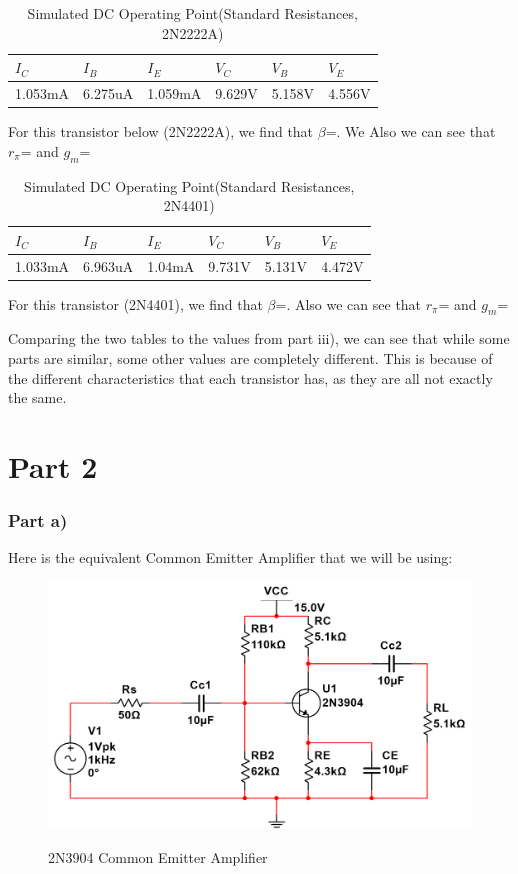 \documentclass[12pt]{article}
\begin{document}
\begin{table}[h!]
\centering
\begin{tabular}{|l|l|l|l|l|l|}
\cline{1-6}
$I_C$      & $I_B$      & $I_E$      & $V_C$     & $V_B$     & $V_E$     \\ \cline{1-6}
\hline
1.053mA & 6.275uA & 1.059mA & 9.629V & 5.158V & 4.556V \\ 
\hline
\end{tabular}
\caption{Simulated DC Operating Point(Standard Resistances, 2N2222A)}
\label{table:DC Standard Operating Values(2N2222A)}
\end{table}

For this transistor below (2N2222A), we find that $\beta$=. We Also we can see that $r_\pi$= and $g_m$=


\begin{table}[h!]
\centering
\begin{tabular}{|l|l|l|l|l|l|}
\cline{1-6}
$I_C$      & $I_B$      & $I_E$      & $V_C$     & $V_B$     & $V_E$     \\ \cline{1-6}
\hline
1.033mA & 6.963uA & 1.04mA & 9.731V & 5.131V & 4.472V \\ 
\hline
\end{tabular}
\caption{Simulated DC Operating Point(Standard Resistances, 2N4401)}
\label{table:DC Standard Operating Values(2N4401)}
\end{table}
\FloatBarrier
For this transistor (2N4401), we find that $\beta$=. Also we can see that $r_\pi$= and $g_m$=

Comparing the two tables to the values from part iii), we can see that while some parts are similar, some other values are completely different. This is because of the different characteristics that each transistor has, as they are all not exactly the same.

\section{Part 2}
\subsubsection{Part a)}
Here is the equivalent Common Emitter Amplifier that we will be using:

\begin{figure}[H]
\centering
\includegraphics[height=0.40\textwidth]{Images/2acircuit.png}\\
\caption{2N3904 Common Emitter Amplifier}
\label{fig:part2a_circuit}
\end{figure}
\end{document}
